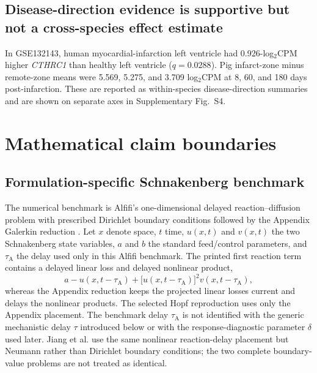 \documentclass[preprint,11pt]{elsarticle}
\newcommand{\cthrc}{\textit{CTHRC1}}
\begin{document}
\subsection{Disease-direction evidence is supportive but not a cross-species effect estimate}
In GSE132143, human myocardial-infarction left ventricle had 0.926-log$_2$CPM higher \cthrc{} than healthy left ventricle ($q=0.0288$). Pig infarct-zone minus remote-zone means were 5.569, 5.275, and 3.709 log$_2$CPM at 8, 60, and 180 days post-infarction. These are reported as within-species disease-direction summaries and are shown on separate axes in Supplementary Fig.~S4.

\section{Mathematical claim boundaries}
\subsection{Formulation-specific Schnakenberg benchmark}
The numerical benchmark is Alfifi's one-dimensional delayed reaction--diffusion problem with prescribed Dirichlet boundary conditions followed by the Appendix Galerkin reduction \cite{Alfifi2022}. Let $x$ denote space, $t$ time, $u(x,t)$ and $v(x,t)$ the two Schnakenberg state variables, $a$ and $b$ the standard feed/control parameters, and $\tau_{\mathrm A}$ the delay used only in this Alfifi benchmark. The printed first reaction term contains a delayed linear loss and delayed nonlinear product,
\begin{equation}
 a-u(x,t-\tau_{\mathrm A})+\big[u(x,t-\tau_{\mathrm A})\big]^2v(x,t-\tau_{\mathrm A}),
\label{eq:alfifi}
\end{equation}
whereas the Appendix reduction keeps the projected linear losses current and delays the nonlinear products. The selected Hopf reproduction uses only the Appendix placement. The benchmark delay $\tau_{\mathrm A}$ is not identified with the generic mechanistic delay $\tau$ introduced below or with the response-diagnostic parameter $\delta$ used later. Jiang et al. \cite{Jiang2019} use the same nonlinear reaction-delay placement but Neumann rather than Dirichlet boundary conditions; the two complete boundary-value problems are not treated as identical.
\end{document}

